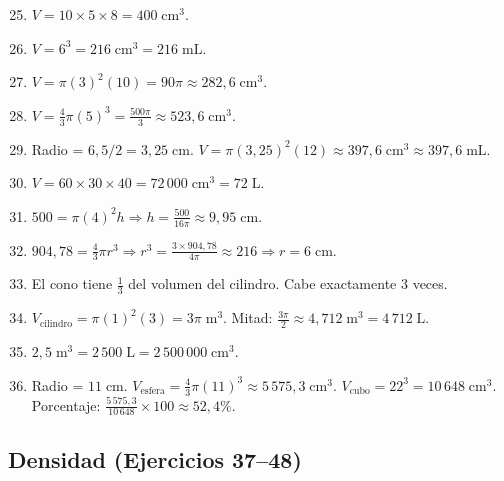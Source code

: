 \documentclass[12pt, a4paper]{article}
\begin{document}
\begin{enumerate}[leftmargin=*, label=\textbf{\arabic*.}]
  \setcounter{enumi}{24}
  \item $V = 10 \times 5 \times 8 = 400\;\text{cm}^3$.

  \item $V = 6^3 = 216\;\text{cm}^3 = 216\;\text{mL}$.

  \item $V = \pi (3)^2 (10) = 90\pi \approx 282{,}6\;\text{cm}^3$.

  \item $V = \frac{4}{3}\pi (5)^3 = \frac{500\pi}{3} \approx 523{,}6\;\text{cm}^3$.

  \item Radio = $6{,}5/2 = 3{,}25\;\text{cm}$. $V = \pi(3{,}25)^2(12) \approx 397{,}6\;\text{cm}^3 \approx 397{,}6\;\text{mL}$.

  \item $V = 60 \times 30 \times 40 = 72\,000\;\text{cm}^3 = 72\;\text{L}$.

  \item $500 = \pi(4)^2 h \Rightarrow h = \frac{500}{16\pi} \approx 9{,}95\;\text{cm}$.

  \item $904{,}78 = \frac{4}{3}\pi r^3 \Rightarrow r^3 = \frac{3 \times 904{,}78}{4\pi} \approx 216 \Rightarrow r = 6\;\text{cm}$.

  \item El cono tiene $\frac{1}{3}$ del volumen del cilindro. Cabe exactamente 3 veces.

  \item $V_{\text{cilindro}} = \pi(1)^2(3) = 3\pi\;\text{m}^3$. Mitad: $\frac{3\pi}{2} \approx 4{,}712\;\text{m}^3 = 4\,712\;\text{L}$.

  \item $2{,}5\;\text{m}^3 = 2\,500\;\text{L} = 2\,500\,000\;\text{cm}^3$.

  \item Radio = $11\;\text{cm}$. $V_{\text{esfera}} = \frac{4}{3}\pi(11)^3 \approx 5\,575{,}3\;\text{cm}^3$. $V_{\text{cubo}} = 22^3 = 10\,648\;\text{cm}^3$. Porcentaje: $\frac{5\,575{,}3}{10\,648} \times 100 \approx 52{,}4\%$.
\end{enumerate}

\subsection*{Densidad (Ejercicios 37--48)}
\end{document}
